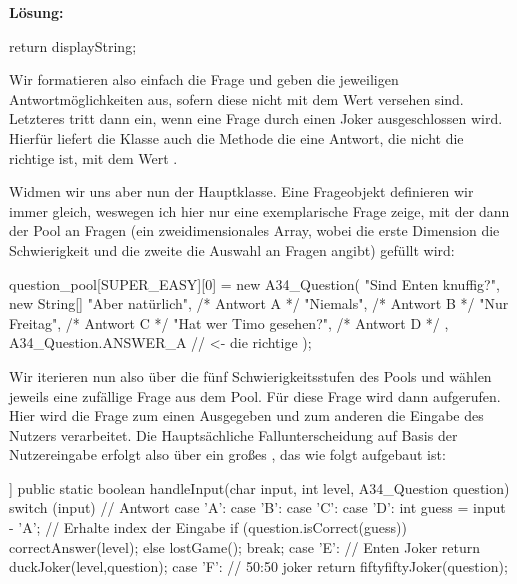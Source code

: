\documentclass[table]{sopra-base}
\makeatletter
\newenvironment{solution}{\null\par\noindent\textbf{\textcolor{sob@col@uulm@cs}{Lösung:}}\newline\bgroup\color{black}\slshape\ignorespaces}{\egroup}
\makeatother
\begin{document}
\begin{solution}
\begin{java}[firstnumber=96]
{    return displayString;
}
\end{java}
    Wir formatieren also einfach die Frage und geben die jeweiligen Antwortmöglichkeiten aus, sofern diese nicht mit dem Wert  versehen sind. Letzteres tritt dann ein, wenn eine Frage durch einen Joker ausgeschlossen wird. Hierfür liefert die Klasse auch die Methode  die eine Antwort, die nicht die richtige ist, mit dem Wert .\par{}
    Widmen wir uns aber nun der Hauptklasse. Eine Frageobjekt definieren wir immer gleich, weswegen ich
    hier nur eine exemplarische Frage zeige, mit der dann der Pool an Fragen (ein zweidimensionales Array, wobei die erste Dimension die Schwierigkeit und die zweite die Auswahl an Fragen angibt) gefüllt wird:
\begin{java*}[morekeywords={[4]{SUPER\_EASY,ANSWER\_A}},add to literate={A34_Question}{{\solGet{keywordC}{A34\_Question}}}{11}]
question_pool[SUPER_EASY][0] = new A34_Question(
    "Sind Enten knuffig?",
    new String[] {
        "Aber natürlich",        /* Antwort A */
        "Niemals",               /* Antwort B */
        "Nur Freitag",           /* Antwort C */
        "Hat wer Timo gesehen?", /* Antwort D */
    }, A34_Question.ANSWER_A // <- die richtige
);
\end{java*}
    Wir iterieren nun also über die fünf Schwierigkeitsstufen des Pools und wählen jeweils eine
    zufällige Frage aus dem Pool. Für diese Frage wird dann  aufgerufen. Hier wird die Frage zum einen Ausgegeben und zum anderen die Eingabe des Nutzers verarbeitet. Die Hauptsächliche Fallunterscheidung auf Basis der Nutzereingabe erfolgt also über ein großes , das wie folgt aufgebaut ist:
\begin{java}[firstnumber=106,add to literate={A34_Question}{{\solGet{keywordC}{A34\_Question}}}{11}]]
public static boolean handleInput(char input, int level,
                                  A34_Question question) {
    switch (input) {
        // Antwort
        case 'A': case 'B':
        case 'C': case 'D':
            int guess = input - 'A'; // Erhalte index der Eingabe
            if (question.isCorrect(guess)) {
                correctAnswer(level);
            } else {
                lostGame();
            }
            break;
        case 'E': // Enten Joker
            return duckJoker(level,question);
        case 'F': // 50:50 joker
            return fiftyfiftyJoker(question);
}}
\end{java}
\end{solution}
\end{document}
